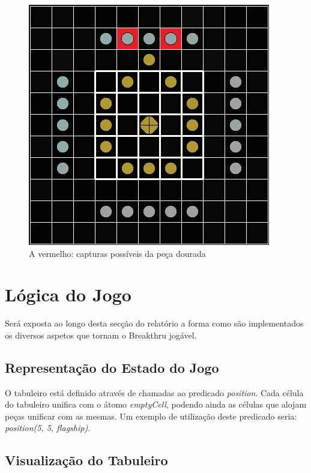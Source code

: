 \documentclass[a4paper]{article}
\begin{document}
\begin{figure}
\centering
\includegraphics[scale=1]{Breakthru_capture.png}
\caption{A vermelho: capturas possíveis da peça dourada}
\label{fig:moves}
\end{figure}

\section{Lógica do Jogo}
Será exposta ao longo desta secção do relatório a forma como são implementados os diversos aspetos que tornam o Breakthru jogável.

\subsection{Representação do Estado do Jogo}
O tabuleiro está definido através de chamadas ao predicado \textit{position}. Cada célula do tabuleiro unifica com o átomo \textit{emptyCell}, podendo ainda as células que alojam peças unificar com as mesmas. Um exemplo de utilização deste predicado seria:
\textit{position(5, 5, flagship).}

\subsection{Visualização do Tabuleiro}
\end{document}
